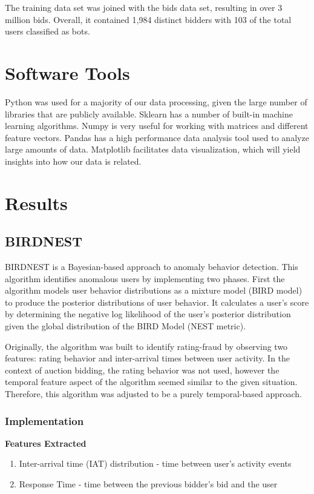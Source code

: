 \documentclass{article} %
\begin{document}
The training data set was joined with the bids data set, resulting in over 3 million bids.
Overall, it contained 1,984 distinct bidders with 103 of the total users classified as bots.

\section{Software Tools}

Python was used for a majority of our data processing, given the large number of libraries that are publicly available.
Sklearn has a number of built-in machine learning algorithms.
Numpy is very useful for working with matrices and different feature vectors.
Pandas has a high performance data analysis tool used to analyze large amounts of data.
Matplotlib facilitates data visualization, which will yield insights into how our data is related.


\section{Results}
\subsection{BIRDNEST}

BIRDNEST \cite{birdnest} is a Bayesian-based approach to anomaly behavior detection. This algorithm identifies anomalous users by implementing two phases. First the algorithm models user behavior distributions as a mixture model (BIRD model) to produce the posterior distributions of user behavior. It calculates a user's score by determining the negative log likelihood of the user's posterior distribution given the global distribution of the BIRD Model (NEST metric).

Originally, the algorithm was built to identify rating-fraud by observing two features: rating behavior and inter-arrival times between user activity. In the context of auction bidding, the rating behavior was not used, however the temporal feature aspect of the algorithm seemed similar to the given situation. Therefore, this algorithm was adjusted to be a purely temporal-based approach.
	
\subsubsection{Implementation}

\textbf{Features Extracted} 

\begin{enumerate}
\item Inter-arrival time (IAT) distribution - time between user's activity events
\item Response Time - time between the previous bidder's bid and the user
\end{enumerate}
\end{document}
